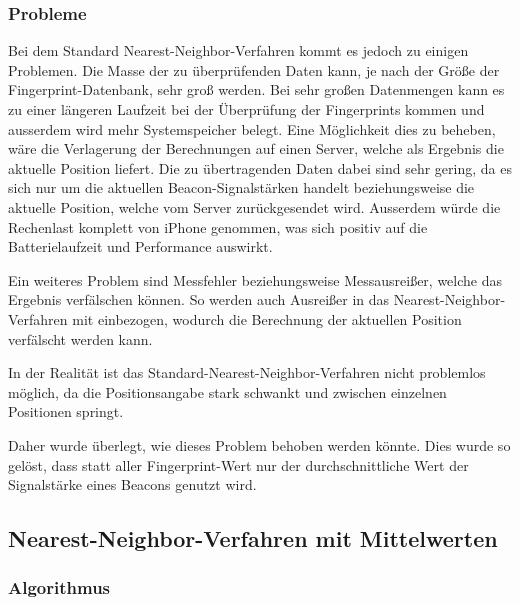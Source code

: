 \subsubsection{Probleme}
\label{sec:implementation:fingerprinting:positioning:naiv:problems}
Bei dem Standard Nearest-Neighbor-Verfahren kommt es jedoch zu einigen Problemen. 
Die Masse der zu überprüfenden Daten kann, je nach der Größe der Fingerprint-Datenbank, sehr groß werden. Bei sehr großen Datenmengen kann es zu einer längeren Laufzeit bei der Überprüfung der Fingerprints kommen und ausserdem wird mehr Systemspeicher belegt. 
Eine Möglichkeit dies zu beheben, wäre die Verlagerung der Berechnungen auf einen Server, welche als Ergebnis die aktuelle Position liefert. Die zu übertragenden Daten dabei sind sehr gering, da es sich nur um die aktuellen Beacon-Signalstärken handelt beziehungsweise die aktuelle Position, welche vom Server zurückgesendet wird. 
Ausserdem würde die Rechenlast komplett von iPhone genommen, was sich positiv auf die Batterielaufzeit und Performance auswirkt.

Ein weiteres Problem sind Messfehler beziehungsweise Messausreißer, welche das Ergebnis verfälschen können. So werden auch Ausreißer in das Nearest-Neighbor-Verfahren mit einbezogen, wodurch die Berechnung der aktuellen Position verfälscht werden kann.

In der Realität ist das Standard-Nearest-Neighbor-Verfahren nicht problemlos möglich, da die Positionsangabe stark schwankt und zwischen einzelnen Positionen springt.

Daher wurde überlegt, wie dieses Problem behoben werden könnte. Dies wurde so gelöst, dass statt aller Fingerprint-Wert nur der durchschnittliche Wert der Signalstärke eines Beacons genutzt wird.


\subsection{Nearest-Neighbor-Verfahren mit Mittelwerten}
\label{sec:implementation:fingerprinting:positioning:avg}

\subsubsection{Algorithmus}
\label{sec:implementation:fingerprinting:positioning:avg:algorithm}

